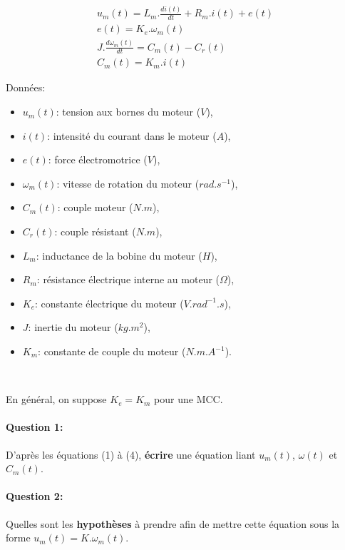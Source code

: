 




\begin{eqnarray}
u_m(t)=L_m.\frac{di(t)}{dt}+R_m.i(t)+e(t) \\
e(t)=K_e.\omega_m(t) \\
J.\frac{d\omega_m(t)}{dt}=C_m(t)-C_r(t) \\
C_m(t)=K_m.i(t)
\end{eqnarray}

Données:
\begin{itemize}
 \item $u_m(t)$: tension aux bornes du moteur ($V$),
 \item $i(t)$: intensité du courant dans le moteur ($A$),
 \item $e(t)$: force électromotrice ($V$),
 \item $\omega_m(t)$: vitesse de rotation du moteur ($rad.s^{-1}$),
 \item $C_m(t)$: couple moteur ($N.m$),
 \item $C_r(t)$: couple résistant ($N.m$),
 \item $L_m$: inductance de la bobine du moteur ($H$),
 \item $R_m$: résistance électrique interne au moteur ($\Omega$),
 \item $K_e$: constante électrique du moteur ($V.rad^{-1}.s$),
 \item $J$: inertie du moteur ($kg.m^2$),
 \item $K_m$: constante de couple du moteur ($N.m.A^{-1}$).
\end{itemize}

~\

En général, on suppose $K_e=K_m$ pour une MCC.

\paragraph{Question 1:} D'après les équations (1) à (4), \textbf{écrire} une équation liant $u_m(t)$, $\omega(t)$ et $C_m(t)$.

\paragraph{Question 2:} Quelles sont les \textbf{hypothèses} à prendre afin de mettre cette équation sous la forme $u_m(t)=K.\omega_m(t)$.

